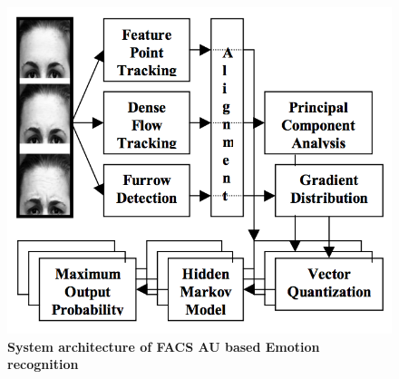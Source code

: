 \begin{figure}
\centering
\includegraphics[width=\columnwidth]{figures/FAU_Kanade}
\caption{\textbf{System architecture of FACS AU based Emotion recognition}}
\label{fig:FACSAU}
\end{figure}